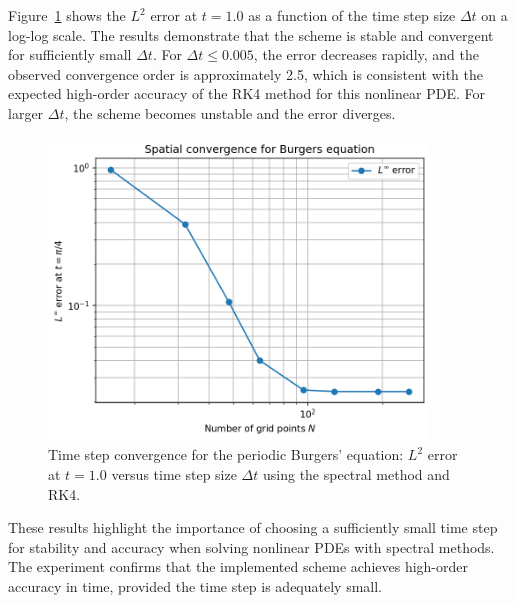 \documentclass{article}
\begin{document}
Figure~\ref{fig:burgers_dt_convergence} shows the $L^2$ error at $t=1.0$ as a function of the time step size $\Delta t$ on a log-log scale. The results demonstrate that the scheme is stable and convergent for sufficiently small $\Delta t$. For $\Delta t \leq 0.005$, the error decreases rapidly, and the observed convergence order is approximately 2.5, which is consistent with the expected high-order accuracy of the RK4 method for this nonlinear PDE. For larger $\Delta t$, the scheme becomes unstable and the error diverges.

\begin{figure}[htbp]
    \centering
    \includegraphics[width=0.9\textwidth]{figure/burgers_N_convergence.png}
    \caption{Time step convergence for the periodic Burgers' equation: $L^2$ error at $t=1.0$ versus time step size $\Delta t$ using the spectral method and RK4.}
    \label{fig:burgers_dt_convergence}
\end{figure}

These results highlight the importance of choosing a sufficiently small time step for stability and accuracy when solving nonlinear PDEs with spectral methods. The experiment confirms that the implemented scheme achieves high-order accuracy in time, provided the time step is adequately small.
\end{document}
